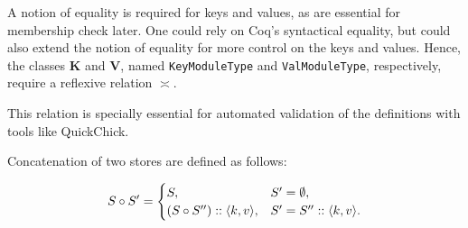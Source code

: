 A notion of equality is required for keys and values, as are essential for membership check later. One could rely on Coq's syntactical equality, but could also extend the notion of equality for more control on the keys and values. Hence, the classes $\mathbf{K}$ and $\mathbf{V}$, named \texttt{KeyModuleType} and \texttt{ValModuleType}, respectively, require a reflexive relation $\asymp$.

This relation is specially essential for automated validation of the definitions with tools like QuickChick.








\begin{definition}
Concatenation of two stores are defined as follows:

\begin{equation*}
S \circ S' =
\begin{cases}
    S, & S' = \emptyset, \\
    (S \circ S'') :: \langle k, v \rangle, & S' = S'' :: \langle k, v \rangle.
\end{cases}
\end{equation*}
\end{definition}

